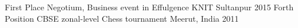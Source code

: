 \begin{cvhonors}
  \cvhonor
    {First Place}
    {Negotium, Business event in Effulgence}
    {KNIT Sultanpur}
    {2015}
  \cvhonor
    {Forth Position}
    {CBSE zonal-level Chess tournament}
    {Meerut, India}
    {2011}
\end{cvhonors}
